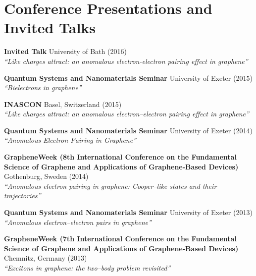 \documentclass[11pt,a4paper,sans]{moderncv}        %
\begin{document}
\section{Conference Presentations and Invited Talks}
\vspace{5pt}
\begin{itemize}
\small{
\item{\textbf{Invited Talk} \small{University of Bath (2016)}\\
		\textit{\small{``Like charges attract: an anomalous electron-electron pairing effect in graphene''}}}
\item{\textbf{Quantum Systems and Nanomaterials Seminar} \small{University of Exeter (2015)}\\
		\textit{\small{``Bielectrons in graphene''}}}
\item{\textbf{INASCON} \small{Basel, Switzerland (2015)}\\
\textit{\small{``Like charges attract: an anomalous electron--electron pairing effect in graphene''}}}
\item{\textbf{Quantum Systems and Nanomaterials Seminar} \small{University of Exeter (2014)}\\
\textit{\small{``Anomalous Electron Pairing in Graphene''}}}
\item{\textbf{GrapheneWeek (8th International Conference on the Fundamental Science of Graphene and Applications of Graphene-Based Devices)} \small{Gothenburg, Sweden (2014)}\\
\textit{\small{``Anomalous electron pairing in graphene: Cooper–like states and their trajectories''}}}
\item{\textbf{Quantum Systems and Nanomaterials Seminar} \small{University of Exeter (2013)}\\
\textit{\small{``Anomalous electron–electron pairs in graphene''}}}
\item{\textbf{GrapheneWeek (7th International Conference on the Fundamental Science of Graphene and Applications of Graphene-Based Devices)} \small{Chemnitz, Germany (2013)}\\
\textit{\small{``Excitons in graphene: the
two–body problem revisited''}}}}
\end{itemize}
\end{document}
